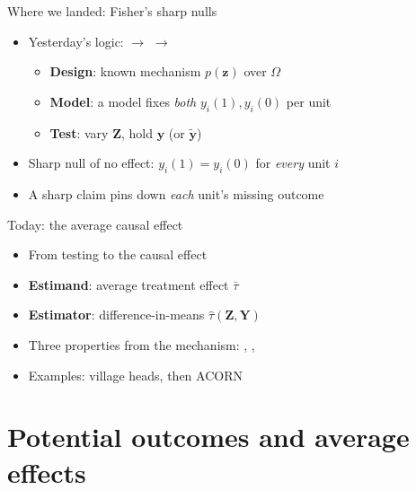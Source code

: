 \documentclass[table, xcolor = {dvipsnames}, 9pt]{beamer}
\theoremstyle{plain}
\newcommand{\mh}[1]{{\color{magenta}{#1}}}
\begin{document}
\begin{frame}[t]{Where we landed: Fisher's sharp nulls}
\vfill
\begin{itemize} \vfill
\item Yesterday's logic: \mh{design} $\to$ \mh{model} $\to$ \mh{test} \vfill
\begin{itemize} \vfill
\item \textbf{Design}: known mechanism $p(\bm{z})$ over $\Omega$ \vfill
\item \textbf{Model}: a \mh{sharp} model fixes \emph{both} $y_i(1), y_i(0)$ per unit \vfill
\item \textbf{Test}: vary $\bm{Z}$, hold $\bm{y}$ (or $\tilde{\bm{y}}$) \mh{fixed} \vfill
\end{itemize} \vfill
\item Sharp null of no effect: $y_i(1) = y_i(0)$ for \emph{every} unit $i$ \vfill
\item A sharp claim pins down \emph{each} unit's missing outcome \vfill
\end{itemize} \vfill
\end{frame}
\begin{frame}[t]{Today: the average causal effect}
\vfill
\begin{itemize} \vfill
\item From \mh{sharp-null} testing to the \mh{average} causal effect \vfill
\item \textbf{Estimand}: average treatment effect $\bar{\tau}$ \vfill
\item \textbf{Estimator}: difference-in-means $\hat{\tau}(\bm{Z}, \bm{Y})$ \vfill
\item Three properties from the mechanism: \mh{unbiasedness}, \mh{variance}, \mh{consistency} \vfill
\item Examples: village heads, then ACORN \vfill
\end{itemize} \vfill
\end{frame}
\section{Potential outcomes and average effects}
\end{document}

